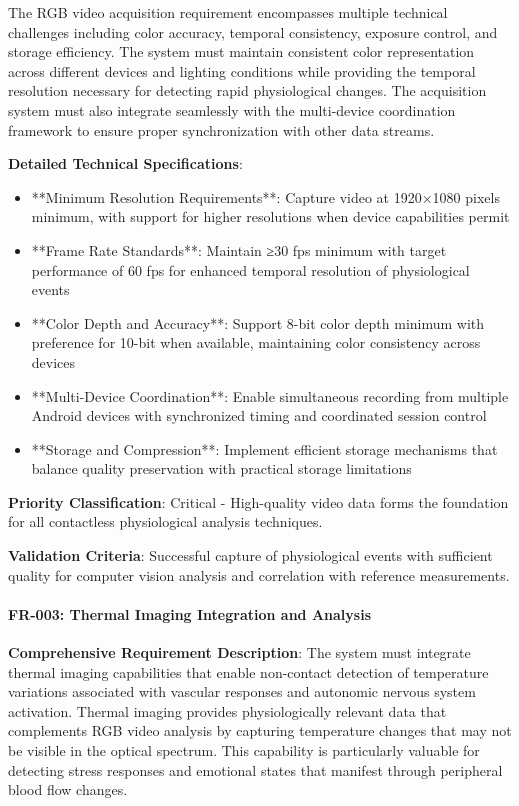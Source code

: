 \documentclass[11pt,a4paper]{report}
\begin{document}
The RGB video acquisition requirement encompasses multiple technical challenges including color accuracy, temporal
consistency, exposure control, and storage efficiency. The system must maintain consistent color representation across
different devices and lighting conditions while providing the temporal resolution necessary for detecting rapid
physiological changes. The acquisition system must also integrate seamlessly with the multi-device coordination
framework to ensure proper synchronization with other data streams.

\textbf{Detailed Technical Specifications}:

\begin{itemize}
\item **Minimum Resolution Requirements**: Capture video at 1920×1080 pixels minimum, with support for higher resolutions
  when device capabilities permit
\item **Frame Rate Standards**: Maintain ≥30 fps minimum with target performance of 60 fps for enhanced temporal resolution
  of physiological events
\item **Color Depth and Accuracy**: Support 8-bit color depth minimum with preference for 10-bit when available, maintaining
  color consistency across devices
\item **Multi-Device Coordination**: Enable simultaneous recording from multiple Android devices with synchronized timing
  and coordinated session control
\item **Storage and Compression**: Implement efficient storage mechanisms that balance quality preservation with practical
  storage limitations

\end{itemize}
\textbf{Priority Classification}: Critical - High-quality video data forms the foundation for all contactless physiological
analysis techniques.

\textbf{Validation Criteria}: Successful capture of physiological events with sufficient quality for computer vision analysis
and correlation with reference measurements.

\paragraph{FR-003: Thermal Imaging Integration and Analysis}

\textbf{Comprehensive Requirement Description}: The system must integrate thermal imaging capabilities that enable
non-contact detection of temperature variations associated with vascular responses and autonomic nervous system
activation. Thermal imaging provides physiologically relevant data that complements RGB video analysis by capturing
temperature changes that may not be visible in the optical spectrum. This capability is particularly valuable for
detecting stress responses and emotional states that manifest through peripheral blood flow changes.
\end{document}
